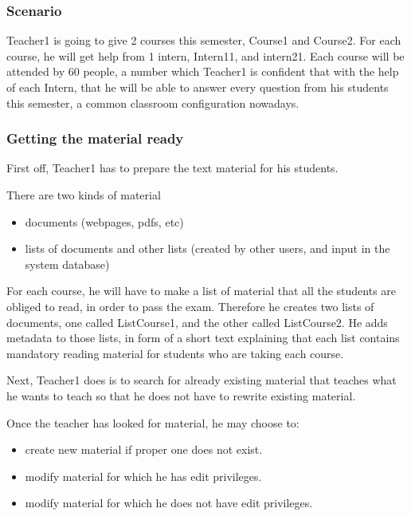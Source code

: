 \documentclass[12pt]{article}
\begin{document}
\subsubsection{Scenario} \label{use-cases-scenario}

Teacher1 is going to give 2 courses this semester, Course1 and Course2. For each course, he will get help from 1 intern, Intern11, and intern21. Each course will be attended by 60 people, a number which Teacher1 is confident that with the help of each Intern, that he will be able to answer every question from his students this semester, a common classroom configuration nowadays.

\subsubsection{Getting the material ready}

First off, Teacher1 has to prepare the text material for his students.

There are two kinds of material

\begin{itemize}
  \item documents (webpages, pdfs, etc)
  \item lists of documents and other lists (created by other users, and input in the system database)
\end{itemize}

For each course, he will have to make a list of material that all the students are obliged to read, in order to pass the exam. Therefore he creates two lists of documents, one called ListCourse1, and the other called ListCourse2. He adds metadata to those lists, in form of a short text explaining that each list contains mandatory reading material for students who are taking each course.

Next, Teacher1 does is to search for already existing material that teaches what he wants to teach so that he does not have to rewrite existing material.

Once the teacher has looked for material, he may choose to:

\begin{itemize}
  \item create new material if proper one does not exist.
  \item modify material for which he has edit privileges.
  \item modify material for which he does not have edit privileges.
\end{itemize}
\end{document}
